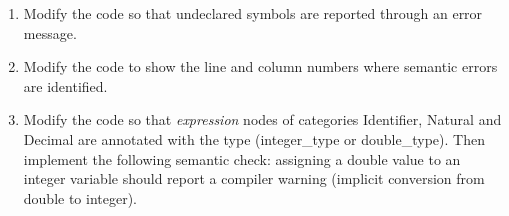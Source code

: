 \begin{enumerate}
\item Modify the code so that undeclared symbols are reported through an error message.
\item Modify the code to show the line and column numbers where semantic errors are identified.
\item Modify the code so that \textit{expression} nodes of categories Identifier, Natural and Decimal are annotated with the type (integer\_type or double\_type). Then implement the following semantic check: assigning a double value to an integer variable should report a compiler warning (implicit conversion from double to integer).
\end{enumerate}